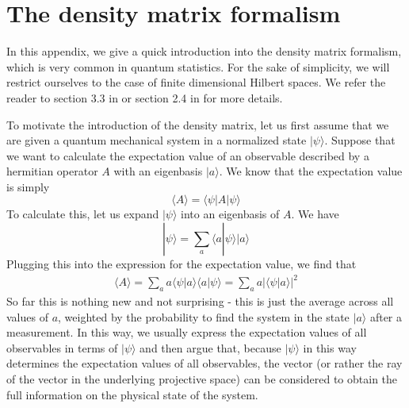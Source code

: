 \documentclass[a4paper, draft]{article}
\theoremstyle{own}
\theoremstyle{remark}
\begin{document}
\section{The density matrix formalism}\label{app:densitymatrix}

In this appendix, we give a quick introduction into the density matrix formalism, which is very common in quantum statistics. For the sake of simplicity, we will restrict ourselves to the case of finite dimensional Hilbert spaces. We refer the reader to section 3.3 in \cite{WeinbergQM} or section 2.4 in \cite{NielsenChuang} for more details. 

To motivate the introduction of the density matrix, let us first assume that we are given a quantum mechanical system in a normalized state $|\psi \rangle$. Suppose that we want to calculate the expectation value of an observable described by a hermitian operator $A$ with an eigenbasis $|a \rangle$. We know that the expectation value is simply
$$
\langle A \rangle = \langle \psi | A | \psi \rangle 
$$
To calculate this, let us expand $|\psi \rangle$ into an eigenbasis of $A$. We have
$$
|\psi \rangle = \sum_a \langle a | \psi \rangle |a \rangle
$$
Plugging this into the expression for the expectation value, we find that
\begin{align}\label{eq:expectationvalue}
\langle A \rangle = \sum_a a \langle \psi | a \rangle \langle a | \psi \rangle 
= \sum_a a |\langle \psi | a \rangle |^2
\end{align}
So far this is nothing new and not surprising - this is just the average across all values of $a$, weighted by the probability to find the system in the state $|a \rangle$ after a measurement. In this way, we usually express the expectation values of all observables in terms of $|\psi \rangle$ and then argue that, because $|\psi \rangle$ in this way determines the expectation values of all observables, the vector (or rather the ray of the vector in the underlying projective space) can be considered to obtain the full information on the physical state of the system.
\end{document}
